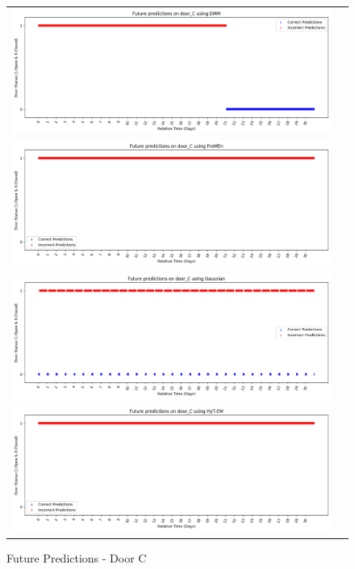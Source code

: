 \begin{center}
\begin{figure}[!Hp]
  \begin{tabular}{cc}
    {\includegraphics[width = 6in]{images/results/Future_door_C_DMM.png}} \\
    {\includegraphics[width = 6in]{images/results/Future_door_C_FreMEn.png}} \\
    {\includegraphics[width = 6in]{images/results/Future_door_C_Gaussian.png}} \\
    {\includegraphics[width = 6in]{images/results/Future_door_C_HyT-EM.png}} \\
  \end{tabular}
  \caption{Future Predictions - Door C}
\end{figure}\\ \\


\end{center}
